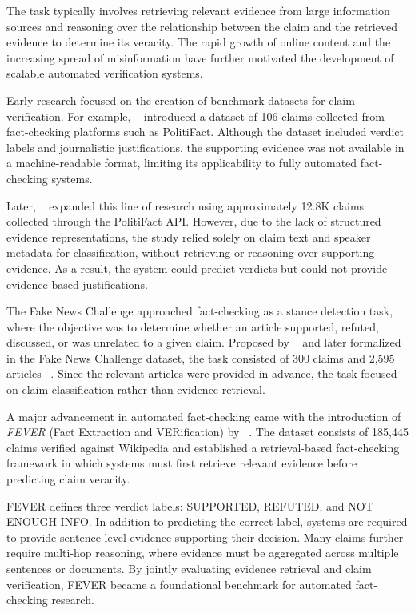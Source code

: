 The task typically involves retrieving relevant evidence from large information sources and reasoning over the relationship between the claim and the retrieved evidence to determine its veracity. The rapid growth of online content and the increasing spread of misinformation have further motivated the development of scalable automated verification systems.

Early research focused on the creation of benchmark datasets for claim verification. For example, ~\citet{Vlachos2014Jun} introduced a dataset of 106 claims collected from fact-checking platforms such as PolitiFact. Although the dataset included verdict labels and journalistic justifications, the supporting evidence was not available in a machine-readable format, limiting its applicability to fully automated fact-checking systems.

Later, ~\citet{Wang2017Jul} expanded this line of research using approximately 12.8K claims collected through the PolitiFact API. However, due to the lack of structured evidence representations, the study relied solely on claim text and speaker metadata for classification, without retrieving or reasoning over supporting evidence. As a result, the system could predict verdicts but could not provide evidence-based justifications.

The Fake News Challenge approached fact-checking as a stance detection task, where the objective was to determine whether an article supported, refuted, discussed, or was unrelated to a given claim. Proposed by ~\citet{Ferreira2016Jun} and later formalized in the Fake News Challenge dataset, the task consisted of 300 claims and 2,595 articles ~\cite{PomerleauDelip2017Jun}. Since the relevant articles were provided in advance, the task focused on claim classification rather than evidence retrieval.

A major advancement in automated fact-checking came with the introduction of \textit{FEVER} (Fact Extraction and VERification) by ~\citet{Thorne2018Jun}. The dataset consists of 185,445 claims verified against Wikipedia and established a retrieval-based fact-checking framework in which systems must first retrieve relevant evidence before predicting claim veracity.

FEVER defines three verdict labels: SUPPORTED, REFUTED, and NOT ENOUGH INFO. In addition to predicting the correct label, systems are required to provide sentence-level evidence supporting their decision. Many claims further require multi-hop reasoning, where evidence must be aggregated across multiple sentences or documents. By jointly evaluating evidence retrieval and claim verification, FEVER became a foundational benchmark for automated fact-checking research.


